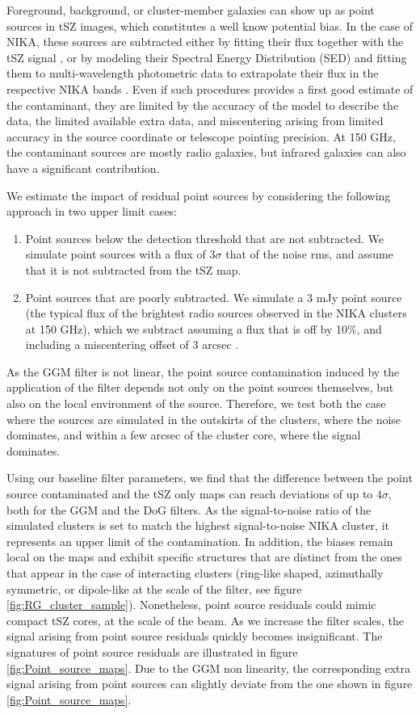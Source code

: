 \documentclass[twocolumn,traditabstract]{aa}
\begin{document}
Foreground, background, or cluster-member galaxies can show up as point sources in tSZ images, which constitutes a well know potential bias. In the case of NIKA, these sources are subtracted either by fitting their flux together with the tSZ signal \citep{Adam2015}, or by modeling their Spectral Energy Distribution (SED) and fitting them to multi-wavelength photometric data to extrapolate their flux in the respective NIKA bands \citep[see the method detailed in][]{Adam2016a}. Even if such procedures provides a first good estimate of the contaminant, they are limited by the accuracy of the model to describe the data, the limited available extra data, and miscentering arising from limited accuracy in the source coordinate or telescope pointing precision. At 150 GHz, the contaminant sources are mostly radio galaxies, but infrared galaxies can also have a significant contribution.

We estimate the impact of residual point sources by considering the following approach in two upper limit cases:
\begin{enumerate} 
\item Point sources below the detection threshold that are not subtracted. We simulate point sources with a flux of $3 \sigma$ that of the noise rms, and assume that it is not subtracted from the tSZ map. 
\item Point sources that are poorly subtracted. We simulate a 3 mJy point source (the typical flux of the brightest radio sources observed in the NIKA clusters at 150 GHz), which we subtract assuming a flux that is off by 10\%, and including a miscentering offset of 3 arcsec \citep[the NIKA pointing accuracy for one scan][]{Catalano2014}.
\end{enumerate}
As the GGM filter is not linear, the point source contamination induced by the application of the filter depends not only on the point sources themselves, but also on the local environment of the source. Therefore, we test both the case where the sources are simulated in the outskirts of the clusters, where the noise dominates, and within a few arcsec of the cluster core, where the signal dominates.

Using our baseline filter parameters, we find that the difference between the point source contaminated and the tSZ only maps can reach deviations of up to $4 \sigma$, both for the GGM and the DoG filters. As the signal-to-noise ratio of the simulated clusters is set to match the highest signal-to-noise NIKA cluster, it represents an upper limit of the contamination. In addition, the biases remain local on the maps and exhibit specific structures that are distinct from the ones that appear in the case of interacting clusters (ring-like shaped, azimuthally symmetric, or dipole-like at the scale of the filter, see figure \ref{fig:RG_cluster_sample}). Nonetheless, point source residuals could mimic compact tSZ cores, at the scale of the beam. As we increase the filter scales, the signal arising from point source residuals quickly becomes insignificant. The signatures of point source residuals are illustrated in figure \ref{fig:Point_source_maps}. Due to the GGM non linearity, the corresponding extra signal arising from point sources can slightly deviate from the one shown in figure \ref{fig:Point_source_maps}.
\end{document}
